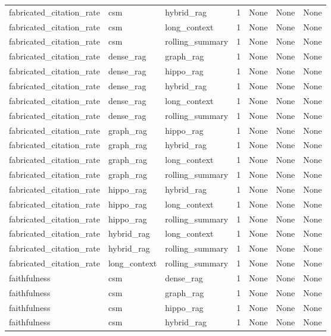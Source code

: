\begin{tabular}{lllllll}
fabricated\_citation\_rate & csm & hybrid\_rag & 1 & None & None & None \\
fabricated\_citation\_rate & csm & long\_context & 1 & None & None & None \\
fabricated\_citation\_rate & csm & rolling\_summary & 1 & None & None & None \\
fabricated\_citation\_rate & dense\_rag & graph\_rag & 1 & None & None & None \\
fabricated\_citation\_rate & dense\_rag & hippo\_rag & 1 & None & None & None \\
fabricated\_citation\_rate & dense\_rag & hybrid\_rag & 1 & None & None & None \\
fabricated\_citation\_rate & dense\_rag & long\_context & 1 & None & None & None \\
fabricated\_citation\_rate & dense\_rag & rolling\_summary & 1 & None & None & None \\
fabricated\_citation\_rate & graph\_rag & hippo\_rag & 1 & None & None & None \\
fabricated\_citation\_rate & graph\_rag & hybrid\_rag & 1 & None & None & None \\
fabricated\_citation\_rate & graph\_rag & long\_context & 1 & None & None & None \\
fabricated\_citation\_rate & graph\_rag & rolling\_summary & 1 & None & None & None \\
fabricated\_citation\_rate & hippo\_rag & hybrid\_rag & 1 & None & None & None \\
fabricated\_citation\_rate & hippo\_rag & long\_context & 1 & None & None & None \\
fabricated\_citation\_rate & hippo\_rag & rolling\_summary & 1 & None & None & None \\
fabricated\_citation\_rate & hybrid\_rag & long\_context & 1 & None & None & None \\
fabricated\_citation\_rate & hybrid\_rag & rolling\_summary & 1 & None & None & None \\
fabricated\_citation\_rate & long\_context & rolling\_summary & 1 & None & None & None \\
faithfulness & csm & dense\_rag & 1 & None & None & None \\
faithfulness & csm & graph\_rag & 1 & None & None & None \\
faithfulness & csm & hippo\_rag & 1 & None & None & None \\
faithfulness & csm & hybrid\_rag & 1 & None & None & None \\

\end{tabular}
